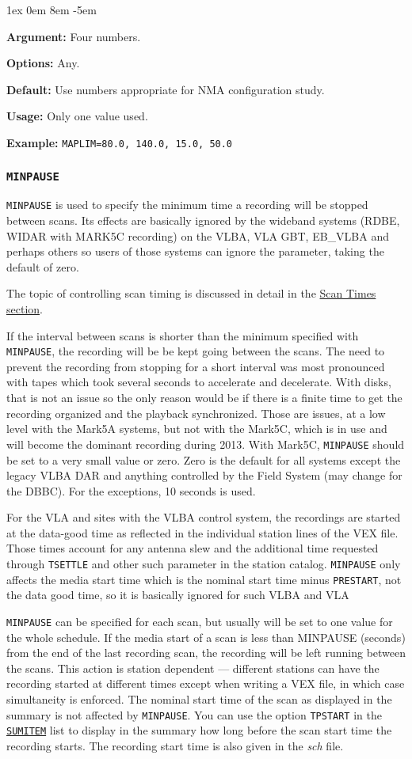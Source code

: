 \documentclass{report}
\newcommand{\rcwbox}[5]{
  \begin{list}{}{\parsep 1ex  \itemsep 0em
                 \leftmargin 8em  \itemindent -5em }
    \item {\bf Argument:} #1
    \item {\bf Options:}  #2
    \item {\bf Default:}  #3
    \item {\bf Usage:}    #4
    \item {\bf Example:}  #5
  \end{list}
}
\begin{document}
\rcwbox
{Four numbers.}
{Any.}
{Use numbers appropriate for NMA configuration study.}
{Only one value used.}
{{\tt MAPLIM=80.0, 140.0, 15.0, 50.0}}


\subsubsection{\label{MP:MINPAUSE}{\tt MINPAUSE}}

{\tt MINPAUSE} is used to specify the minimum time a recording will be
stopped between scans.  Its effects are basically ignored by the 
wideband systems (RDBE, WIDAR with MARK5C recording) on the VLBA, VLA
GBT, EB\_VLBA and perhaps others so users of those systems can ignore
the parameter, taking the default of zero.

The topic of controlling scan timing is discussed in detail in
the 
{\hyperref[SSEC:SCANTIMES]{Scan Times section}}.

If the interval between scans is shorter than the minimum specified
with {\tt MINPAUSE}, the recording will be be kept going between the
scans.  The need to prevent the recording from stopping for a short
interval was most pronounced with tapes which took several seconds to
accelerate and decelerate.  With disks, that is not an issue so the
only reason would be if there is a finite time to get the recording
organized and the playback synchronized.  Those are issues, at a low
level with the Mark5A systems, but not with the Mark5C, which is in
use and will become the dominant recording during 2013.  With Mark5C,
{\tt MINPAUSE} should be set to a very small value or zero.  Zero is
the default for all systems except the legacy VLBA DAR and anything
controlled by the Field System (may change for the DBBC).  For the
exceptions, 10 seconds is used.

For the VLA and sites with the VLBA control system, the recordings are
started at the data-good time as reflected in the individual station
lines of the VEX file.  Those times account for any antenna slew and
the additional time requested through {\tt TSETTLE} and other such
parameter in the station catalog.  {\tt MINPAUSE} only affects the
media start time which is the nominal start time minus {\tt PRESTART},
not the data good time, so it is basically ignored for such VLBA and
VLA

{\tt MINPAUSE} can be specified for each scan, but usually will be set
to one value for the whole schedule.  If the media start of a scan is
less than MINPAUSE (seconds) from the end of the last recording scan,
the recording will be left running between the scans.  This action is
station dependent --- different stations can have the recording
started at different times except when writing a VEX file, in which
case simultaneity is enforced.  The nominal start time of the scan as
displayed in the summary is not affected by {\tt MINPAUSE}.  You can
use the option {\tt TPSTART} in the 
{\hyperref[MP:SUMITEM]{{\tt SUMITEM}}}
list to display in the summary how long before
the scan start time the recording starts.  The recording start time is
also given in the {\sl sch} file.
\end{document}
